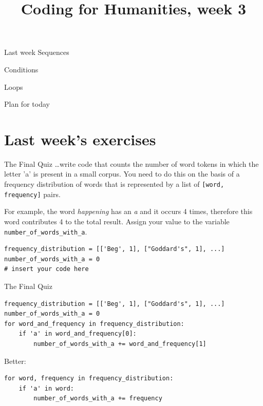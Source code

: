 \documentclass[aspectratio=169,usenames,dvipsnames]{beamer}
\title{Coding for Humanities, week 3}
\begin{document}
\begin{frame}
 \titlepage
\end{frame}

\begin{frame}{Last week}
    \Large
    Sequences

    \vspace{1em}
    Conditions

    \vspace{1em}
    Loops
\end{frame}

\begin{frame}{Plan for today}
 \tableofcontents
\end{frame}

\section{Last week's exercises}
\begin{frame}[fragile]{The Final Quiz}
\dots write code that counts the number of word tokens in
which the letter 'a' is present in a small corpus. You need to do this on the
basis of a frequency distribution of words that is represented by a list of
\texttt{[word, frequency]} pairs.

For example, the word \emph{happening} has an \emph{a} and it occurs
4 times, therefore this word contributes 4 to the total result.
Assign your value to the variable \texttt{number\_of\_words\_with\_a}.

\begin{lstlisting}
frequency_distribution = [['Beg', 1], ["Goddard's", 1], ...]
number_of_words_with_a = 0
# insert your code here
\end{lstlisting}
\end{frame}

\begin{frame}[fragile]{The Final Quiz}
\begin{lstlisting}
frequency_distribution = [['Beg', 1], ["Goddard's", 1], ...]
number_of_words_with_a = 0
for word_and_frequency in frequency_distribution:
    if 'a' in word_and_frequency[0]:
        number_of_words_with_a += word_and_frequency[1]
\end{lstlisting}

\pause
Better:
\begin{lstlisting}
for word, frequency in frequency_distribution:
    if 'a' in word:
        number_of_words_with_a += frequency
\end{lstlisting}
\end{frame}
\end{document}
